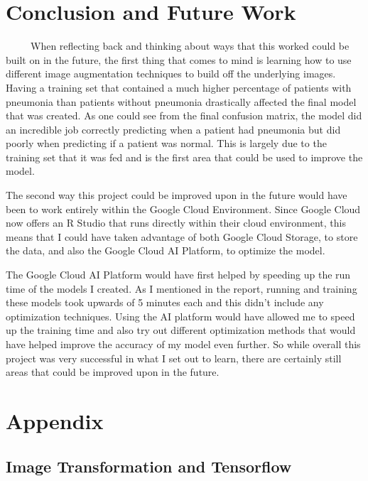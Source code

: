 \documentclass[12pt]{article}
\begin{document}
\hypertarget{conclusion-and-future-work}{%
\section{Conclusion and Future Work}\label{conclusion-and-future-work}}

~~~~~When reflecting back and thinking about ways that this worked could
be built on in the future, the first thing that comes to mind is
learning how to use different image augmentation techniques to build off
the underlying images. Having a training set that contained a much
higher percentage of patients with pneumonia than patients without
pneumonia drastically affected the final model that was created. As one
could see from the final confusion matrix, the model did an incredible
job correctly predicting when a patient had pneumonia but did poorly
when predicting if a patient was normal. This is largely due to the
training set that it was fed and is the first area that could be used to
improve the model.

The second way this project could be improved upon in the future would
have been to work entirely within the Google Cloud Environment. Since
Google Cloud now offers an R Studio that runs directly within their
cloud environment, this means that I could have taken advantage of both
Google Cloud Storage, to store the data, and also the Google Cloud AI
Platform, to optimize the model.

The Google Cloud AI Platform would have first helped by speeding up the
run time of the models I created. As I mentioned in the report, running
and training these models took upwards of 5 minutes each and this didn't
include any optimization techniques. Using the AI platform would have
allowed me to speed up the training time and also try out different
optimization methods that would have helped improve the accuracy of my
model even further. So while overall this project was very successful in
what I set out to learn, there are certainly still areas that could be
improved upon in the future.

\hypertarget{appendix}{%
\section{Appendix}\label{appendix}}

\hypertarget{image-transformation-and-tensorflow-1}{%
\subsection{Image Transformation and
Tensorflow}\label{image-transformation-and-tensorflow-1}}
\end{document}
